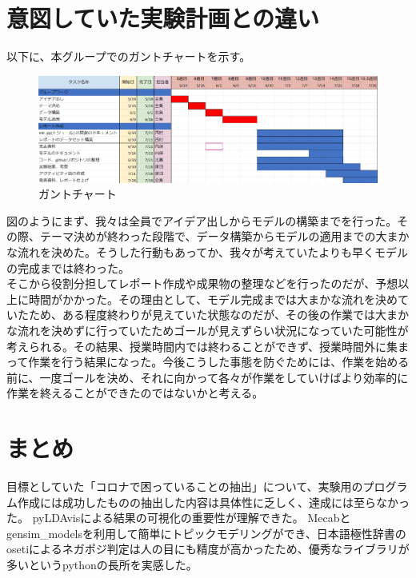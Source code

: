 \documentclass[a4paper, 11pt, titlepage]{jsarticle}
\begin{document}
\section{意図していた実験計画との違い}
以下に、本グループでのガントチャートを示す。\\
\begin{figure}[H]
  \centering
  \includegraphics[scale=0.5]{gantotya-to.png}
  \caption{ガントチャート}
\end{figure}
図のようにまず、我々は全員でアイデア出しからモデルの構築までを行った。その際、テーマ決めが終わった段階で、データ構築からモデルの適用までの大まかな流れを決めた。そうした行動もあってか、我々が考えていたよりも早くモデルの完成までは終わった。\\
そこから役割分担してレポート作成や成果物の整理などを行ったのだが、予想以上に時間がかかった。その理由として、モデル完成までは大まかな流れを決めていたため、ある程度終わりが見えていた状態なのだが、その後の作業では大まかな流れを決めずに行っていたためゴールが見えずらい状況になっていた可能性が考えられる。その結果、授業時間内では終わることができず、授業時間外に集まって作業を行う結果になった。今後こうした事態を防ぐためには、作業を始める前に、一度ゴールを決め、それに向かって各々が作業をしていけばより効率的に作業を終えることができたのではないかと考える。

\section{まとめ}
目標としていた「コロナで困っていることの抽出」について、実験用のプログラム作成には成功したものの抽出した内容は具体性に乏しく、達成には至らなかった。
pyLDAvisによる結果の可視化の重要性が理解できた。
Mecabとgensim\_modelsを利用して簡単にトピックモデリングができ、日本語極性辞書のosetiによるネガポジ判定は人の目にも精度が高かったため、優秀なライブラリが多いというpythonの長所を実感した。
\end{document}
